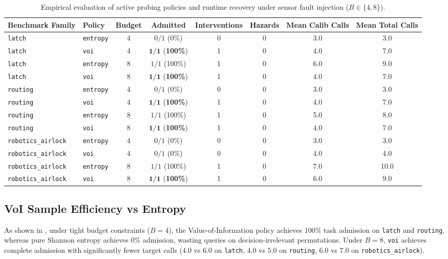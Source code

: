 \documentclass[10pt,twocolumn,letterpaper]{article}
\begin{document}
\begin{table}[t]
\centering
\small
\caption{Empirical evaluation of active probing policies and runtime recovery under sensor fault injection ($B \in \{4, 8\}$).}
\label{tab:results}
\begin{tabular}{llcccccc}
\toprule
\textbf{Benchmark Family} & \textbf{Policy} & \textbf{Budget} & \textbf{Admitted} & \textbf{Interventions} & \textbf{Hazards} & \textbf{Mean Calib Calls} & \textbf{Mean Total Calls} \\
\midrule
\texttt{latch} & \texttt{entropy} & 4 & $0/1$ (0\%) & 0 & 0 & 3.0 & 3.0 \\
\texttt{latch} & \texttt{voi} & 4 & $\mathbf{1/1}$ (\textbf{100\%}) & 1 & 0 & 4.0 & 7.0 \\
\texttt{latch} & \texttt{entropy} & 8 & $1/1$ (100\%) & 1 & 0 & 6.0 & 9.0 \\
\texttt{latch} & \texttt{voi} & 8 & $\mathbf{1/1}$ (\textbf{100\%}) & 1 & 0 & $\mathbf{4.0}$ & $\mathbf{7.0}$ \\
\midrule
\texttt{routing} & \texttt{entropy} & 4 & $0/1$ (0\%) & 0 & 0 & 3.0 & 3.0 \\
\texttt{routing} & \texttt{voi} & 4 & $\mathbf{1/1}$ (\textbf{100\%}) & 1 & 0 & 4.0 & 7.0 \\
\texttt{routing} & \texttt{entropy} & 8 & $1/1$ (100\%) & 1 & 0 & 5.0 & 8.0 \\
\texttt{routing} & \texttt{voi} & 8 & $\mathbf{1/1}$ (\textbf{100\%}) & 1 & 0 & $\mathbf{4.0}$ & $\mathbf{7.0}$ \\
\midrule
\texttt{robotics\_airlock} & \texttt{entropy} & 4 & $0/1$ (0\%) & 0 & 0 & 3.0 & 3.0 \\
\texttt{robotics\_airlock} & \texttt{voi} & 4 & $0/1$ (0\%) & 0 & 0 & 4.0 & 4.0 \\
\texttt{robotics\_airlock} & \texttt{entropy} & 8 & $1/1$ (100\%) & 1 & 0 & 7.0 & 10.0 \\
\texttt{robotics\_airlock} & \texttt{voi} & 8 & $\mathbf{1/1}$ (\textbf{100\%}) & 1 & 0 & $\mathbf{6.0}$ & $\mathbf{9.0}$ \\
\bottomrule
\end{tabular}
\end{table}

\subsection{VoI Sample Efficiency vs Entropy}
As shown in , under tight budget constraints ($B = 4$), the Value-of-Information policy achieves $100\%$ task admission on \texttt{latch} and \texttt{routing}, whereas pure Shannon entropy achieves $0\%$ admission, wasting queries on decision-irrelevant permutations. Under $B=8$, \texttt{voi} achieves complete admission with significantly fewer target calls ($4.0$ vs $6.0$ on \texttt{latch}, $4.0$ vs $5.0$ on \texttt{routing}, $6.0$ vs $7.0$ on \texttt{robotics\_airlock}).
\end{document}

